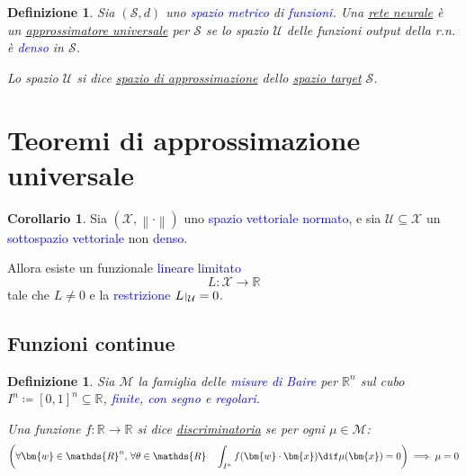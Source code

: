 \documentclass[10pt]{book}
\newcommand{\1}{\mathds{1}}
\newcommand{\R}{\mathds{R}}
\newcommand{\norma}[1]{%
\left\lVert#1\right\rVert%
}
\let\restriction\relax
\def\restriction#1#2{\mathchoice
              {\setbox1\hbox{${\displaystyle #1}_{\scriptstyle #2}$}
              \restrictionaux{#1}{#2}}
              {\setbox1\hbox{${\textstyle #1}_{\scriptstyle #2}$}
              \restrictionaux{#1}{#2}}
              {\setbox1\hbox{${\scriptstyle #1}_{\scriptscriptstyle #2}$}
              \restrictionaux{#1}{#2}}
              {\setbox1\hbox{${\scriptscriptstyle #1}_{\scriptscriptstyle #2}$}
              \restrictionaux{#1}{#2}}}
\def\restrictionaux#1#2{{#1\,\smash{\vrule height .8\ht1 depth .85\dp1}}_{\,#2}}
\theoremstyle{definition}%
\newtheorem{cor}[thm]{Corollario}
\theoremstyle{plain}
\newtheorem{definizione}[thm]{Definizione}
\theoremstyle{remark}
\renewcommand{\href}[2]{\textcolor{blue}{#2}}
\begin{document}
\begin{definizione}
Sia \((\mathcal{S}, d)\) uno \href{../../../../../org/roam/20250301193511-spazio_metrico.org}{spazio metrico} di \href{../../../../../org/roam/20250202170607-classe_relazione_binaria.org}{funzioni}. Una \hyperref[sec:org599fe74]{rete neurale} è un \uline{approssimatore universale} per \(\mathcal{S}\) se lo spazio \(\mathcal{U}\) delle funzioni output della r.n. è \href{../../../../../org/roam/20250301193045-sottoinsieme_denso.org}{denso} in \(\mathcal{S}\).

Lo spazio \(\mathcal{U}\) si dice \uline{spazio di approssimazione} dello \uline{spazio target} \(\mathcal{S}\).
\end{definizione}
\section{Teoremi di approssimazione universale}
\label{sec:org788dc7f}

\begin{cor}
Sia \((\mathcal{X}, \norma{\cdot})\) uno \href{../../../../../org/roam/20241205142027-spazio_vettoriale.org}{spazio vettoriale} \href{../../../../../org/roam/20250625123506-spazio_normato.org}{normato}, e sia \(\mathcal{U} \subseteq \mathcal{X}\) un \href{../../../../../org/roam/20250114103118-sottospazio_vettoriale.org}{sottospazio vettoriale} non \href{../../../../../org/roam/20250301193045-sottoinsieme_denso.org}{denso}.

Allora esiste un funzionale \href{../../../../../org/roam/20250114101949-funzione_lineare.org}{lineare} \href{../../../../../org/roam/20250704145518-funzione_limitata.org}{limitato}
\begin{equation*}
L:\mathcal{X}\to \R
\end{equation*}
tale che \(L\neq 0\) e la \href{../../../../../org/roam/20250205170515-restrizione_di_una_classe.org}{restrizione} \(\restriction{L}{\mathcal{U}} = 0\).
\label{lem:9.3.2}
\end{cor}
\subsection{Funzioni continue}
\label{sec:orgb3bfbf4}

\begin{definizione}
Sia \(\mathcal{M}\) la famiglia delle \href{../../../../../org/roam/20250625104200-misura_di_baire.org}{misure di Baire} per \(\R^{n}\) sul cubo \(I^{n} \coloneqq [0,1]^{n} \subseteq \R\), \href{../../../../../org/roam/20250625110016-misura_finita.org}{finite}, \href{../../../../../org/roam/20250625110024-misura_con_segno.org}{con segno} e \href{../../../../../org/roam/20250625110032-misura_regolare.org}{regolari}.

Una funzione \(f: \R\to \R\) si dice \uline{discriminatoria} se per ogni \(\mu \in \mathcal{M}\):
\begin{equation*}
\left(\forall \bm{w} \in \R^{n},\, \forall \theta \in \R\quad \int_{I^{n}} f(\bm{w}\cdot\bm{x}) \dif \mu(\bm{x}) = 0\right)\implies \mu=0
\end{equation*}
\end{definizione}
\end{document}
